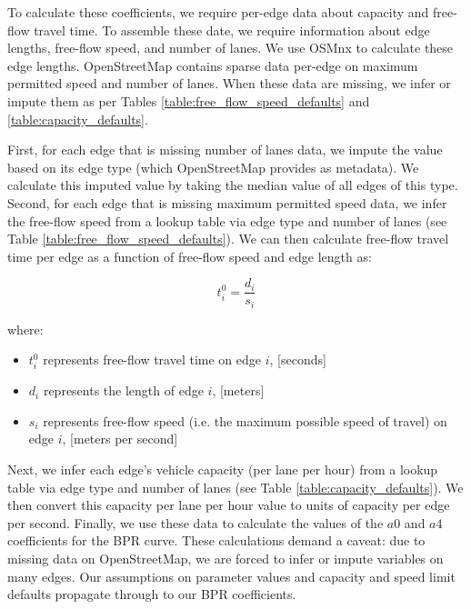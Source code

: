 To calculate these coefficients, we require per-edge data about capacity and free-flow travel time. To assemble these date, we require information about edge lengths, free-flow speed, and number of lanes. We use OSMnx to calculate these edge lengths. OpenStreetMap contains sparse data per-edge on maximum permitted speed and number of lanes. When these data are missing, we infer or impute them as per Tables \ref{table:free_flow_speed_defaults} and \ref{table:capacity_defaults}.

First, for each edge that is missing number of lanes data, we impute the value based on its edge type (which OpenStreetMap provides as metadata). We calculate this imputed value by taking the median value of all edges of this type. Second, for each edge that is missing maximum permitted speed data, we infer the free-flow speed from a lookup table via edge type and number of lanes (see Table \ref{table:free_flow_speed_defaults}). We can then calculate free-flow travel time per edge as a function of free-flow speed and edge length as:

\bigskip
\begin{equation}
    t^0_i = \frac{d_i}{s_i}
    \label{eq:free_flow_travel_time}
\end{equation}

\bigskip
where:

\bigskip
\begin{itemize}
    \item $t^0_i$ represents free-flow travel time on edge $i$, [seconds]
    \item $d_i$ represents the length of edge $i$, [meters]
    \item $s_i$ represents free-flow speed (i.e. the maximum possible speed of travel) on edge $i$, [meters per second]
\end{itemize}

\bigskip
Next, we infer each edge's vehicle capacity (per lane per hour) from a lookup table via edge type and number of lanes (see Table \ref{table:capacity_defaults}). We then convert this capacity per lane per hour value to units of capacity per edge per second. Finally, we use these data to calculate the values of the $a0$ and $a4$ coefficients for the BPR curve. These calculations demand a caveat: due to missing data on OpenStreetMap, we are forced to infer or impute variables on many edges. Our assumptions on parameter values and capacity and speed limit defaults propagate through to our BPR coefficients.

